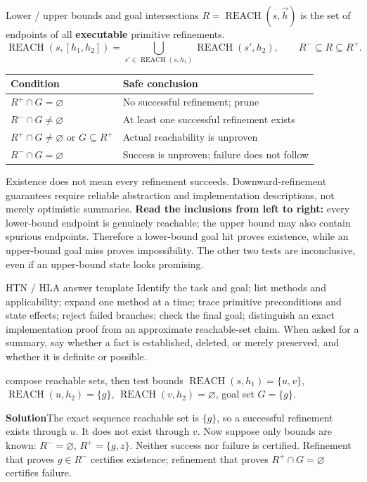 \documentclass[10pt,a4paper]{article}
\newcommand{\ans}{\par\smallskip\textbf{\color{good}Solution\quad}}
\newcommand{\Reach}{\operatorname{REACH}}
\begin{document}
\begin{card}{Lower / upper bounds and goal intersections}
$R=\Reach(s,\vec h)$ is the set of endpoints of all \textbf{executable} primitive refinements.
\[
\Reach(s,[h_1,h_2])=\bigcup_{s'\in\Reach(s,h_1)}\Reach(s',h_2),
\qquad R^-\subseteq R\subseteq R^+.
\]
\small
\par\smallskip
\begin{tabularx}{\linewidth}{@{}P{5.0cm}Y@{}}
\toprule Condition & Safe conclusion \\\midrule
$R^+\cap G=\varnothing$ & No successful refinement; prune \\
$R^-\cap G\ne\varnothing$ & At least one successful refinement exists \\
$R^+\cap G\ne\varnothing$ or $G\subseteq R^+$ & Actual reachability is unproven \\
$R^-\cap G=\varnothing$ & Success is unproven; failure does not follow \\\bottomrule
\end{tabularx}\par\smallskip
\normalsize
Existence does not mean every refinement succeeds. Downward-refinement guarantees require reliable abstraction and implementation descriptions, not merely optimistic summaries.
\textbf{Read the inclusions from left to right:} every lower-bound endpoint is genuinely reachable; the upper bound may also contain spurious endpoints. Therefore a lower-bound goal hit proves existence, while an upper-bound goal miss proves impossibility. The other two tests are inconclusive, even if an upper-bound state looks promising.
\end{card}

\begin{card}{HTN / HLA answer template}
Identify the task and goal; list methods and applicability; expand one method at a time; trace primitive preconditions and state effects; reject failed branches; check the final goal; distinguish an exact implementation proof from an approximate reachable-set claim. When asked for a summary, say whether a fact is established, deleted, or merely preserved, and whether it is definite or possible.
\end{card}

\begin{question}{compose reachable sets, then test bounds}
$\Reach(s,h_1)=\{u,v\}$, $\Reach(u,h_2)=\{g\}$, $\Reach(v,h_2)=\varnothing$, goal set $G=\{g\}$.
\ans The exact sequence reachable set is $\{g\}$, so a successful refinement exists through $u$. It does not exist through $v$. Now suppose only bounds are known: $R^-=\varnothing$, $R^+=\{g,z\}$. Neither success nor failure is certified. Refinement that proves $g\in R^-$ certifies existence; refinement that proves $R^+\cap G=\varnothing$ certifies failure.
\end{question}
\end{document}
